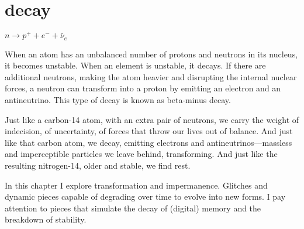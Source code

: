 \chapter*{decay}
\begin{center}
\vspace{2cm}
\begin{flushright}
\large
\textit{ $n \rightarrow p^+ + e^- + \bar{\nu}_e$ }
\end{flushright}
\vspace{2cm}
\end{center}
\normalsize

When an atom has an unbalanced number of protons and neutrons in its nucleus, it becomes unstable. When an element is unstable, it decays. If there are additional neutrons, making the atom heavier and disrupting the internal nuclear forces, a neutron can transform into a proton by emitting an electron and an antineutrino. This type of decay is known as beta-minus decay.

Just like a carbon-14 atom, with an extra pair of neutrons, we carry the weight of indecision, of uncertainty, of forces that throw our lives out of balance. And just like that carbon atom, we decay, emitting electrons and antineutrinos—massless and imperceptible particles we leave behind, transforming. And just like the resulting nitrogen-14, older and stable, we find rest.

In this chapter I explore transformation and impermanence. Glitches and dynamic pieces capable of degrading over time to evolve into new forms. I pay attention to pieces that simulate the decay of (digital) memory and the breakdown of stability.  

